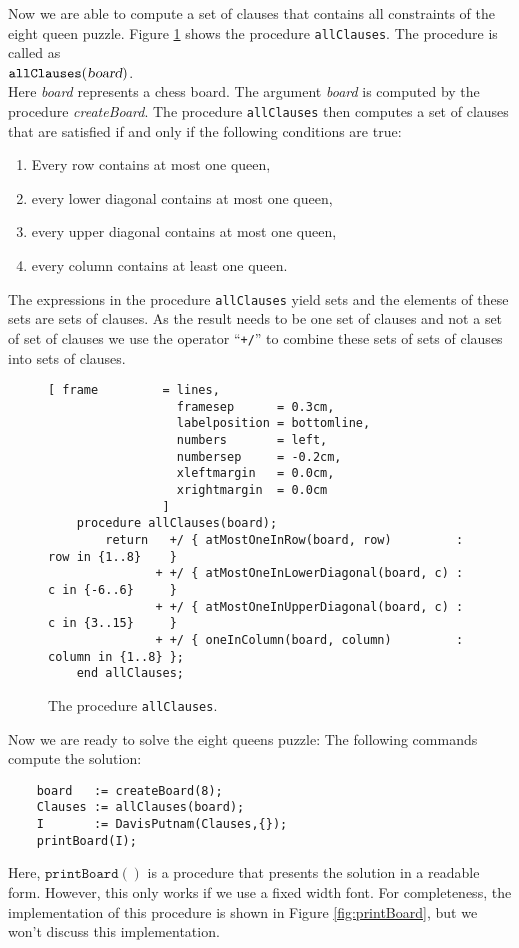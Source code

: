 Now we are able to compute a set of clauses that contains all constraints of the eight
queen puzzle.
Figure \ref{fig:allClauses} shows the procedure \texttt{allClauses}.
The procedure is called as  \\[0.2cm]
\hspace*{1.3cm} $\mathtt{allClauses}(\textsl{board})$. \\[0.2cm]
Here \textsl{board} represents a chess board.  The argument \textsl{board} is computed by
the procedure \textsl{createBoard}.  The procedure \texttt{allClauses} 
then computes a set of clauses that are
satisfied if and only if the following conditions are true:
\begin{enumerate}
\item Every row contains at most one queen,
\item every lower diagonal contains at most one queen,
\item every upper diagonal contains at most one queen,
\item every column contains at least one queen.
\end{enumerate}
The expressions in the procedure \texttt{allClauses}
yield sets and the elements of these sets are sets of clauses.
As the result needs to be one set of clauses and not a set of set of clauses
we use the operator ``\texttt{+/}'' to combine these sets of sets of clauses into sets of clauses.

\begin{figure}[!ht]
  \centering
\begin{Verbatim}[ frame         = lines, 
                  framesep      = 0.3cm, 
                  labelposition = bottomline,
                  numbers       = left,
                  numbersep     = -0.2cm,
                  xleftmargin   = 0.0cm,
                  xrightmargin  = 0.0cm
                ]
    procedure allClauses(board);
        return   +/ { atMostOneInRow(board, row)         : row in {1..8}    }
               + +/ { atMostOneInLowerDiagonal(board, c) : c in {-6..6}     }
               + +/ { atMostOneInUpperDiagonal(board, c) : c in {3..15}     }
               + +/ { oneInColumn(board, column)         : column in {1..8} };
    end allClauses;
\end{Verbatim}
\vspace*{-0.3cm}
  \caption{The procedure \texttt{allClauses}.}
  \label{fig:allClauses}
\end{figure}

Now we are ready to solve the eight queens puzzle:  The following commands compute the solution:
\begin{verbatim}
    board   := createBoard(8);
    Clauses := allClauses(board);
    I       := DavisPutnam(Clauses,{});
    printBoard(I);
\end{verbatim}
Here,  $\texttt{printBoard}()$ is a procedure that presents the solution in a readable form.
However, this only works if we use a fixed width font.  For completeness, the
implementation of this procedure is shown in
Figure  \ref{fig:printBoard}, but we won't discuss this implementation.


